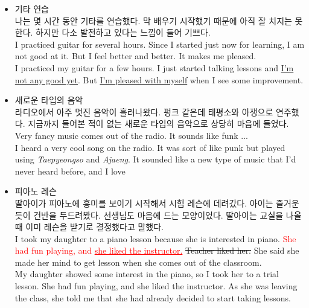 \begin{itemize}
  \item 기타 연습\\
  
  나는 몇 시간 동안 기타를 연습했다. 막 배우기 시작했기 때문에 아직 잘 치지는 못한다. 하지만 다소 발전하고 있다는 느낌이 들어 기쁘다.\\
  
  I practiced guitar for several hours. Since I started just now for learning, I am not good at it. But I feel better and better. It makes me pleased.\\
  
  I practiced my guitar for a few hours. I just started talking lessons and \underline{I'm not any good yet}. But \underline{I'm pleased with myself} when I see some improvement.\\
  
  \item 새로운 타입의 음악\\
  
  라디오에서 아주 멋진 음악이 흘러나왔다. 펑크 같은데 태평소와 아쟁으로 연주했다. 지금까지 들어본 적이 없는 새로운 타입의 음악으로 상당히 마음에 들었다.\\
  
  Very fancy music comes out of the radio. It sounds like funk ...\\
  
  I heard a very cool song on the radio. It was sort of like punk but played using \textit{Taepyeongso} and \textit{Ajaeng}. It sounded like a new type of music that I'd never heard before, and I love \\
  
  \item 피아노 레슨\\
  
  딸아이가 피아노에 흥미를 보이기 시작해서 시험 레슨에 데려갔다. 아이는 즐거운 듯이 건반을 두드려봤다. 선생님도 마음에 드는 모양이었다. 딸아이는 교실을 나올 때 이미 레슨을 받기로 결정했다고 말했다.\\
  
  I took my daughter to a piano lesson because she is interested in piano. \textcolor{red}{She had fun playing, and \underline{she liked the instructor.}} \sout{Teacher liked her.} She said she made her mind to get lesson when she comes out of the classroom.\\
  
  My daughter showed some interest in the piano, so I took her to a trial lesson. She had fun playing, and she liked the instructor. As she was leaving the class, she told me that she had already decided to start taking lessons.\\
  

\end{itemize}

